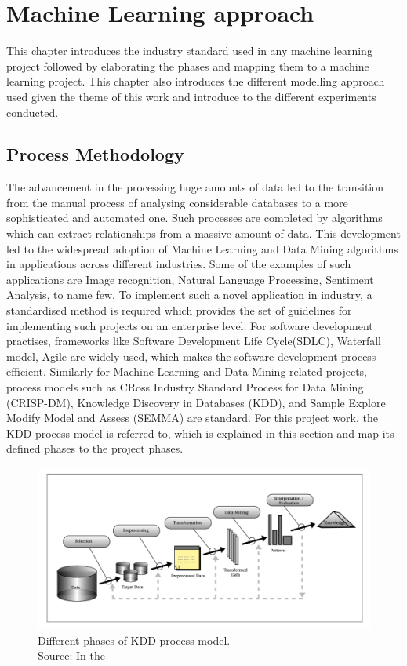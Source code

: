 \chapter{Machine Learning approach} \label{chap:system_archi}
This chapter introduces the industry standard used in any machine learning project followed by elaborating the phases and mapping them to a machine learning project. This chapter also introduces the different modelling approach used given the theme of this work and introduce to the different experiments conducted.

\section{Process Methodology} \label{sect:Kdd}
The advancement in the processing huge amounts of data led to the transition from the manual process of analysing considerable databases to a more sophisticated and automated one. Such processes are completed by algorithms which can extract relationships from a massive amount of data. This development led to the widespread adoption of Machine Learning and Data Mining algorithms in applications across different industries. Some of the examples of such applications are  Image recognition, Natural Language Processing, Sentiment Analysis, to name few. To implement such a novel application in industry, a standardised method is required which provides the set of guidelines for implementing such projects on an enterprise level. For software development practises, frameworks like Software Development Life Cycle(SDLC), Waterfall model, Agile are widely used, which makes the software development process efficient. Similarly for Machine Learning and Data Mining related projects, process models such as CRoss Industry Standard Process for Data Mining (CRISP-DM), Knowledge Discovery in Databases (KDD), and Sample Explore Modify Model and Assess (SEMMA) are standard. For this project work, the KDD process model is referred to, which is explained in this section and map its defined phases to the project phases. \\ 
\par


\begin{figure}
    \centering
    \includegraphics[scale=0.5]{chapters/figures/CRISP-DM.png}
    \caption{Different phases of KDD process model. \\ 
    Source: In the \textcite[41]{fayyad1996data}}
    \label{fig:CRISP_DM}
\end{figure}

